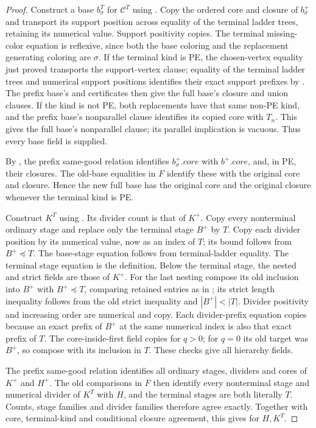 \begin{proof}
Construct a base $b^T_\sigma$ for $\mathcal C^T$ using
. Copy the ordered core and closure of
$b^+_\sigma$ and transport its support position across equality of the
terminal ladder trees, retaining its numerical value. Support positivity
copies. The terminal missing-color equation is reflexive, since both the
base coloring and the replacement generating coloring are $\sigma$.
If the terminal kind is PE, the chosen-vertex equality just proved
transports the support-vertex clause; equality of the terminal ladder trees
and numerical support positions identifies their exact support prefixes
by . The prefix base's
 and  certificates
then give the full base's closure and union clauses. If the kind is not
PE, both replacements have that same non-PE kind, and the prefix base's
nonparallel clause identifies its copied core with $T_n$. This gives the
full base's nonparallel clause; its parallel implication is vacuous.
Thus every base field is supplied.

By , the prefix same-good relation identifies
$b^+_\sigma.\mathit{core}$ with $b^+.\mathit{core}$, and, in PE, their
closures. The old-base equalities in $F$ identify these with the original
core and closure. Hence the new full base has the original core and the
original closure whenever the terminal kind is PE.

Construct $K^T$ using . Its divider count is
that of $K^+$. Copy every nonterminal ordinary stage and replace only the
terminal stage $B^+$ by $T$. Copy each divider position by its numerical
value, now as an index of $T$; its bound follows from $B^+\preccurlyeq T$.
The base-stage equation follows from terminal-ladder equality. The terminal
stage equation is the definition. Below the terminal stage, the nested and
strict fields are those of $K^+$. For the last nesting compose its old
inclusion into $B^+$ with $B^+\preccurlyeq T$, comparing retained entries
as in ; its strict length inequality
follows from the old strict inequality and $|B^+|<|T|$. Divider positivity
and increasing order are numerical and copy. Each divider-prefix equation
copies because an exact prefix of $B^+$ at the same numerical index is
also that exact prefix of $T$. The core-inside-first field copies for
$q>0$; for $q=0$ its old target was $B^+$, so compose with its inclusion
in $T$. These checks give all hierarchy fields.

The prefix same-good relation identifies all ordinary stages, dividers
and cores of $K^+$ and $H^+$. The old comparisons in $F$ then identify
every nonterminal stage and numerical divider of $K^T$ with $H$, and the
terminal stages are both literally $T$. Counts, stage families and divider
families therefore agree exactly. Together with core, terminal-kind and
conditional closure agreement, this gives
 for $H,K^T$.


\end{proof}
